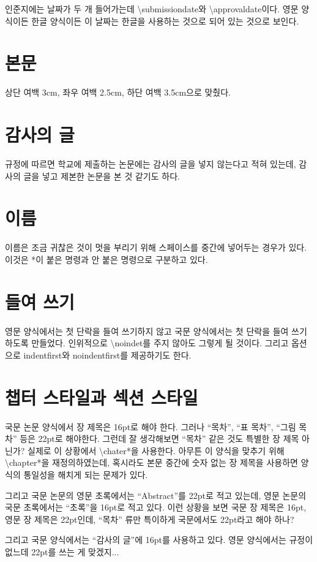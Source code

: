 \documentclass[a4paper]{report}
\begin{document}
인준지에는 날짜가 두 개 들어가는데 
\textbackslash submissiondate와 \textbackslash approvaldate이다.
영문 양식이든 한글 양식이든 이 날짜는 한글을 사용하는 것으로
되어 있는 것으로 보인다.

\section{본문}
상단 여백 3cm, 좌우 여백 2.5cm, 하단 여백 3.5cm으로 맞췄다.

\section{감사의 글}
규정에 따르면 학교에 제출하는 논문에는 감사의 글을 넣지 않는다고
적혀 있는데, 감사의 글을 넣고 제본한 논문을 본 것 같기도 하다.

\section{이름}
이름은 조금 귀찮은 것이 멋을 부리기 위해 스페이스를
중간에 넣어두는 경우가 있다. 이것은 *이 붙은 명령과
안 붙은 명령으로 구분하고 있다.

\section{들여 쓰기}
영문 양식에서는 첫 단락을 들여 쓰기하지 않고
국문 양식에서는 첫 단락을 들여 쓰기하도록
만들었다.
인위적으로 \textbackslash noindet를 주지 않아도
그렇게 될 것이다.
그리고 옵션으로 indentfirst와 noindentfirst를 제공하기도 한다.

\section{챕터 스타일과 섹션 스타일}
국문 논문 양식에서 장 제목은 16pt로 해야 한다.
그러나 ``목차'', ``표 목차'', ``그림 목차'' 등은
22pt로 해야한다. 그런데 잘 생각해보면 ``목차''
같은 것도 특별한 장 제목 아닌가?
실제로  이 상황에서 \textbackslash chater*을
사용한다. 아무튼 
이 양식을 맞추기 위해 \textbackslash chapter*을
재정의하였는데, 혹시라도 본문 중간에 숫자 없는 장
제목을 사용하면 양식의 통일성을 해치게 되는 문제가 있다.

그리고 국문 논문의 영문 초록에서는 ``Abstract''를 22pt로
적고 있는데, 영문 논문의 국문 초록에서는 ``초록''을
16pt로 적고 있다. 이런 상황을 보면 국문 장 제목은
16pt, 영문 장 제목은 22pt인데, ``목차'' 류만 특이하게
국문에서도 22pt라고 해야 하나?

그리고 국문 양식에서는 ``감사의 글''에 16pt를 사용하고 있다.
영문 양식에서는 규정이 없느데 22pt를 쓰는 게 맞겠지...
\end{document}
